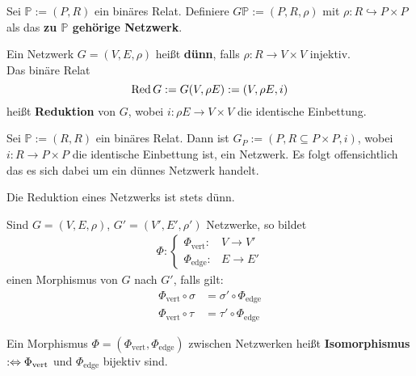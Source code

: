 \begin{definition}
Sei $\mathbb{P}:=(P,R)$ ein binäres Relat. Definiere $G\mathbb{P}:=(P,R,\rho)$ mit $\rho:R\hookrightarrow P\times P$ als das \textbf{zu $\mathbb{P}$ gehörige Netzwerk}.
\end{definition}

\begin{definition}
    Ein Netzwerk $G=(V,E,\rho)$ heißt \textbf{dünn}, 
    falls $\rho:R\to V\times V$ injektiv.\\
    Das binäre Relat
    $$ \operatorname{Red} G := G(V, \rho E) := (V, \rho E, i)$$
    heißt \textbf{Reduktion} von $G$, wobei
    $i: \rho E \to V \times V$ die identische Einbettung.
\end{definition}

\begin{beispiel}
    Sei $\mathbb{P} := (R, R)$ ein binäres Relat.
    Dann ist $G_P := (P, R \subseteq P \times P, i)$, wobei
    $i: R \to P \times P$ die identische Einbettung ist,
    ein Netzwerk.
    Es folgt offensichtlich das es sich dabei um ein dünnes Netzwerk handelt.
\end{beispiel}

\begin{korollar}
    Die Reduktion eines Netzwerks ist stets dünn.
\end{korollar}

\begin{definition}
    Sind $G=(V,E,\rho)$, $G'=(V',E',\rho')$ Netzwerke, so bildet
    \begin{align*}
        \Phi:\left\lbrace\begin{array}{rl}
        \Phi_{\text{vert}}:&V\to V'\\
        \Phi_{\text{edge}}:&E\to E'
        \end{array}\right.
    \end{align*}
    einen Morphismus von $G$ nach $G'$, falls gilt:
    \begin{align*}
        \Phi_{\text{vert}}\circ\sigma&=\sigma'\circ\Phi_{\text{edge}}\\
        \Phi_{\text{vert}}\circ\tau&=\tau'\circ\Phi_{\text{edge}}
    \end{align*}
\end{definition}

\begin{definition}
    Ein Morphismus $\Phi=(\Phi_{\text{vert}},\Phi_{\text{edge}})$ zwischen Netzwerken heißt \textbf{Isomorphismus} $:\Leftrightarrow\Phi_{\text{vert}}$ und $\Phi_{\text{edge}}$ bijektiv sind.
\end{definition}

